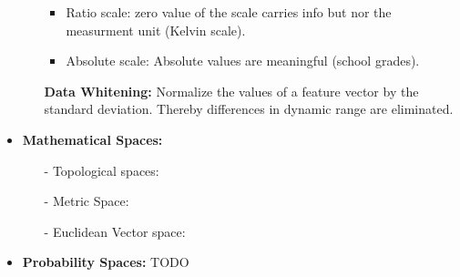 \begin{itemize}
\begin{itemize}
\begin{itemize}
            \item Ratio scale: zero value of the scale carries info but nor the measurment unit (Kelvin scale).
            \item Absolute scale: Absolute values are meaningful (school grades).
        \end{itemize}{}
        \textbf{\danger \quad Data Whitening: }Normalize the values of a feature vector by the standard deviation. Thereby differences in dynamic range are eliminated.
    \end{itemize}{}
    \item\textbf{Mathematical Spaces: }
    \begin{itemize}
        \item[-]Topological spaces:
        \item[-]Metric Space:
        \item[-]Euclidean Vector space:
    \end{itemize}{}
    \item\textbf{Probability Spaces: }TODO
\end{itemize}{}